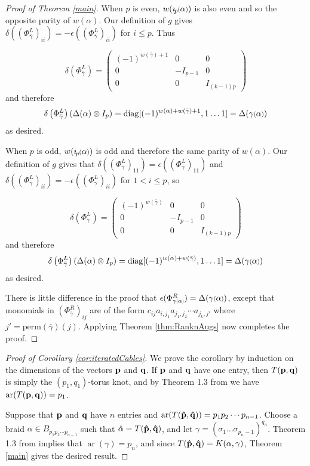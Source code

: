 \documentclass[11pt]{amsart}
\def\ar{\operatorname{ar}}
\newcommand*{\smallp}[1]{\scalebox{.75}{\ensuremath#1}}
\newcommand*{\subsmallp}[1]{\scalebox{.5}{\ensuremath#1}}
\newcommand{\pp}[2][p]{\imath_{\hspace*{-1pt}#1}\hspace*{-.5pt}\smallp(#2\smallp)}
\newcommand\diag{\operatorname{diag}}
\theoremstyle{definition}
\begin{document}
\begin{proof}[Proof of Theorem \ref{main}]
When $p$ is even, $w(\pp\alpha)$ is also even and so the opposite parity of $w(\alpha)$. Our definition of $g$ gives $\delta\left(\left(\Phi_{\bar\gamma}^L\right)_{ii}\right) = -\epsilon\left(\left(\Phi_{\bar\gamma}^L\right)_{ii}\right)$ for $i\le p$. Thus 

$$\delta\left(\Phi_{\bar\gamma}^L\right) = 
\left( \begin{array}{ccc}
(-1)^{w(\bar\gamma)+1} & 0 & 0 \\
0 & -I_{p-1} & 0 \\
0 & 0 & I_{(k-1)p} \end{array} \right)
$$
\noindent and therefore
$$
\delta\left(\Phi_{\bar\gamma}^L\right)\left(\Delta(\alpha)\otimes I_p\right) = \diag[(-1)^{w(\alpha) + w(\bar\gamma) + 1},1\ldots 1] = \Delta(\gamma\smallp(\alpha\smallp))
$$
\noindent as desired.

When $p$ is odd, $w(\pp\alpha)$ is odd and therefore the same parity of $w(\alpha)$. Our definition of $g$ gives that $\delta\left(\left(\Phi_{\bar\gamma}^L\right)_{11}\right) = \epsilon\left(\left(\Phi_{\bar\gamma}^L\right)_{11}\right)$ and $\delta\left(\left(\Phi_{\bar\gamma}^L\right)_{ii}\right) = -\epsilon\left(\left(\Phi_{\bar\gamma}^L\right)_{ii}\right)$ for $1<i\le p$, so 

$$\delta\left(\Phi_{\bar\gamma}^L\right) = 
\left( \begin{array}{ccc}
(-1)^{w(\bar\gamma)} & 0 & 0 \\
0 & -I_{p-1} & 0 \\
0 & 0 & I_{(k-1)p} \end{array} \right)
$$
\noindent and therefore
$$
\delta\left(\Phi_{\bar\gamma}^L\right)\left(\Delta(\alpha)\otimes I_p\right)= \diag[(-1)^{w(\alpha) + w(\bar\gamma)},1\ldots 1] = \Delta(\gamma\smallp(\alpha\smallp))
$$
\noindent as desired. 

There is little difference in the proof that $\epsilon(\Phi_{\gamma\subsmallp(\alpha\subsmallp)}^R) = \Delta(\gamma\smallp(\alpha\smallp))$, except that monomials in $(\Phi_{\bar\gamma}^R)_{ij}$ are of the form $c_{ij}a_{i,j_1}a_{j_1,j_2}\cdots a_{j_k,j'}$ where $j'=\text{perm}(\bar\gamma)(j)$. Applying Theorem \ref{thm:RanknAugs} now completes the proof.
\end{proof}

\begin{proof}[Proof of Corollary \ref{cor:iteratedCables}]
We prove the corollary by induction on the dimensions of the vectors ${\bf p}$ and ${\bf q}$.  If ${\bf p}$ and ${\bf q}$ have one entry, then $T({\bf p},{\bf q})$ is simply the $(p_1,q_1)$-torus knot, and by Theorem 1.3 from \cite{Cor13b} we have $\ar(T({\bf p},{\bf q})) = p_1$.

Suppose that ${\bf p}$ and ${\bf q}$ have $n$ entries and $\ar(T({\bf \hat p},{\bf \hat q})) = p_1p_2\cdots p_{n-1}$.  Choose a braid $\alpha\in B_{p_1p_2\cdots p_{n-1}}$ such that $\hat\alpha = T({\bf \hat p},{\bf \hat q})$, and let $\gamma = (\sigma_1\ldots \sigma_{p_n-1})^{q_n}$.  Theorem 1.3 from \cite{Cor13b} implies that $\ar(\gamma) = p_n$, and since $T({\bf \hat p},{\bf \hat q}) = K(\alpha,\gamma)$, Theorem \ref{main} gives the desired result.
\end{proof}
\end{document}
